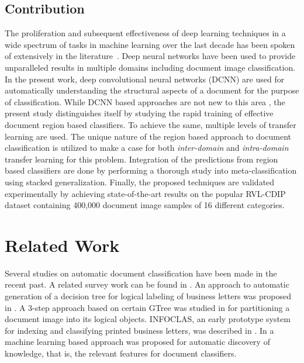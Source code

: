 \documentclass[10pt,conference,a4paper]{IEEEtran}
\begin{document}
\subsection{Contribution}
The proliferation and subsequent effectiveness of deep learning techniques in a wide spectrum of tasks in machine learning over the last decade has been spoken of extensively in the literature~\cite{schmidhuber2015deep,lecun2015deep}. Deep neural networks have been used to provide unparalleled results in multiple domains including document image classification. In the present work, deep convolutional neural networks (DCNN) are used for automatically understanding the structural aspects of a document for the purpose of classification. While DCNN based approaches are not new to this area \cite{kang2014, afzal2015, harley2015evaluation}, the present study distinguishes itself by studying the rapid training of effective document region based classifiers. To achieve the same, multiple levels of transfer learning are used. The unique nature of the region based approach to document classification is utilized to make a case for both \textit{inter-domain} and \textit{intra-domain} transfer learning for this problem. Integration of the predictions from region based classifiers are done by performing a thorough study into meta-classification using stacked generalization. Finally, the proposed techniques are validated experimentally by achieving state-of-the-art results on the popular RVL-CDIP dataset containing 400,000 document image samples of 16 different categories.

\section{Related Work}

Several studies on automatic document classification have been made in the recent past. A related survey work can be found in \cite{chen2007}. An approach to automatic generation of a decision tree for logical labeling of business letters was proposed in \cite{dengel1993}. A 3-step approach based on certain GTree was studied in \cite{dengel1994} for partitioning a document image into its logical objects. INFOCLAS, an early prototype system  for indexing and classifying printed business letters, was described in \cite{Hoch1994}. In \cite{Junker1997} a machine learning based approach was proposed for automatic discovery of knowledge, that is, the relevant features for document classifiers.
\end{document}
